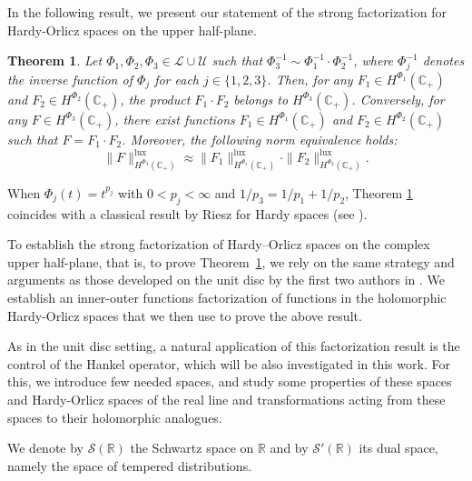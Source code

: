 \documentclass[a4paper,12pt,intlimits,oneside]{amsart}
\newtheorem{theorem}{Theorem}[section]
\theoremstyle{definition}
\numberwithin{equation}{section}
\theoremstyle{definition}
\begin{document}
In the following result, we present our statement of the strong factorization for Hardy-Orlicz spaces on the upper half-plane. 



\begin{theorem}\label{pro:main2aqop}
Let $\Phi_{1}, \Phi_{2}, \Phi_{3} \in \mathscr{L} \cup \mathscr{U}$  such that $\Phi_{3}^{-1} \sim \Phi_{1}^{-1}\cdot \Phi_{2}^{-1}$, where $\Phi_{j}^{-1}$ denotes the inverse function of $\Phi_{j}$ for each $j \in \{1,2,3\}$. Then, for any $F_{1} \in H^{\Phi_{1}}(\mathbb{C}_{+})$ and $F_{2} \in H^{\Phi_{2}}(\mathbb{C}_{+})$, the product $F_{1}\cdot F_{2}$ belongs to $H^{\Phi_{3}}(\mathbb{C}_{+})$.  Conversely, for any $F \in H^{\Phi_{3}}(\mathbb{C}_{+})$, there exist functions $F_{1} \in H^{\Phi_{1}}(\mathbb{C}_{+})$ and $F_{2} \in H^{\Phi_{2}}(\mathbb{C}_{+})$ such that
$F = F_{1}\cdot F_{2}$.
Moreover, the following norm equivalence holds:
\begin{equation}\label{eq:ap21}
\|F\|_{H^{\Phi_{3}}(\mathbb{C}_{+})}^{\mathrm{lux}} \approx \|F_{1}\|_{H^{\Phi_{1}}(\mathbb{C}_{+})}^{\mathrm{lux}} \cdot \|F_{2}\|_{H^{\Phi_{2}}(\mathbb{C}_{+})}^{\mathrm{lux}}.
\end{equation}
\end{theorem}

When  $\Phi_{j}(t)=t^{p_{j}}$ with  $0< p_{j}  < \infty$ and $1/p_{3}= 1/p_{1} + 1/p_{2}$, Theorem \ref{pro:main2aqop} coincides with a classical result by Riesz for Hardy spaces (see \cite{wrudin}). 

\medskip

To establish the strong factorization of Hardy--Orlicz spaces on the complex upper half-plane, that is, to prove Theorem~\ref{pro:main2aqop}, we rely on the same strategy and arguments as those developed on the unit disc by the first two authors in \cite{djefeuto1}. We establish an inner-outer functions factorization of functions in the holomorphic Hardy-Orlicz spaces that we then use to prove the above result.

As in the unit disc setting, a natural application of this factorization result is the control of the Hankel operator, which will be also investigated in this work. For this, we introduce few needed spaces, and study some properties of these spaces and Hardy-Orlicz spaces of the real line and transformations acting from these spaces to their holomorphic analogues.

\medskip


We denote by $\mathscr{S}(\mathbb{R})$ the Schwartz space on $\mathbb{R}$ and by $\mathscr{S}'(\mathbb{R})$ its dual space, namely the space of tempered distributions.
\end{document}
